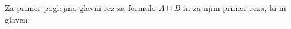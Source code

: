 \begin{primer*} \label{gl rez in}
    Za primer poglejmo glavni rez za formulo $A \sqcap B$ in za njim primer reza, ki ni glaven:
    \begin{center}
        \begin{bprooftree}


        \end{bprooftree}
        \begin{prooftree}


        \end{prooftree}
    \end{center}
\end{primer*}
